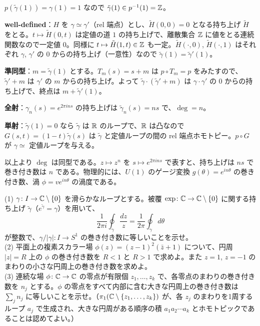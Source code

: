 \begin{solution}
$p(\tilde\gamma(1))=\gamma(1)=1$ なので $\tilde\gamma(1)\in p^{-1}(1)=\mathbb{Z}$。

\textbf{well-defined}：$H$ を $\gamma\simeq\gamma'$（rel 端点）とし、$\tilde H(0,0)=0$ となる持ち上げ $\tilde H$ をとる。$t\mapsto\tilde H(0,t)$ は定値の道 $1$ の持ち上げで、離散集合 $\mathbb{Z}$ に値をとる連続関数なので一定値 $0$。同様に $t\mapsto\tilde H(1,t)\in\mathbb{Z}$ も一定。$\tilde H(\cdot,0)$, $\tilde H(\cdot,1)$ はそれぞれ $\gamma$, $\gamma'$ の $0$ からの持ち上げ（一意性）なので $\tilde\gamma(1)=\tilde\gamma'(1)$。

\textbf{準同型}：$m=\tilde\gamma(1)$ とする。$T_m(s)=s+m$ は $p\circ T_m=p$ をみたすので、$\tilde\gamma'+m$ は $\gamma'$ の $m$ からの持ち上げ。よって $\tilde\gamma\cdot(\tilde\gamma'+m)$ は $\gamma\cdot\gamma'$ の $0$ からの持ち上げで、終点は $m+\tilde\gamma'(1)$。

\textbf{全射}：$\gamma_n(s)=e^{2\pi ins}$ の持ち上げは $\tilde\gamma_n(s)=ns$ で、$\deg=n$。

\textbf{単射}：$\tilde\gamma(1)=0$ なら $\tilde\gamma$ は $\mathbb{R}$ のループで、$\mathbb{R}$ は凸なので $G(s,t)=(1-t)\tilde\gamma(s)$ は $\tilde\gamma$ と定値ループの間の rel 端点ホモトピー。$p\circ G$ が $\gamma\simeq$ 定値ループを与える。

以上より $\deg$ は同型である。$z\mapsto z^n$ を $s\mapsto e^{2\pi ins}$ で表すと、持ち上げは $ns$ で巻き付き数は $n$ である。物理的には、$U(1)$ のゲージ変換 $g(\theta)=e^{in\theta}$ の巻き付き数、渦 $\phi=ve^{in\theta}$ の渦度である。
\end{solution}

\begin{problem}[難易度 B]\label{ch02-prob-windint}
(1) $\gamma\colon I\to\mathbb{C}\setminus\{0\}$ を滑らかなループとする。被覆 $\exp\colon\mathbb{C}\to\mathbb{C}\setminus\{0\}$ に関する持ち上げ $\tilde\gamma$（$e^{\tilde\gamma}=\gamma$）を用いて、
\[
\frac{1}{2\pi i}\oint_\gamma\frac{dz}{z}=\frac{1}{2\pi}\oint_\gamma d\theta
\]
が整数で、$\gamma/\lvert\gamma\rvert\colon I\to S^1$ の巻き付き数に等しいことを示せ。\\
(2) 平面上の複素スカラー場 $\phi(z)=(z-1)^2(\bar z+1)$ について、円周 $\lvert z\rvert=R$ 上の $\phi$ の巻き付き数を $R<1$ と $R>1$ で求めよ。また $z=1$, $z=-1$ のまわりの小さな円周上の巻き付き数を求めよ。\\
(3) 連続な場 $\phi\colon\mathbb{C}\to\mathbb{C}$ の零点が有限個 $z_1,\dots,z_k$ で、各零点のまわりの巻き付き数を $n_j$ とする。$\phi$ の零点をすべて内部に含む大きな円周上の巻き付き数は $\sum_jn_j$ に等しいことを示せ。（$\pi_1(\mathbb{C}\setminus\{z_1,\dots,z_k\})$ が、各 $z_j$ のまわりを1周するループ $a_j$ で生成され、大きな円周がある順序の積 $a_{1}a_2\cdots a_k$ とホモトピックであることは認めてよい。）
\end{problem}

